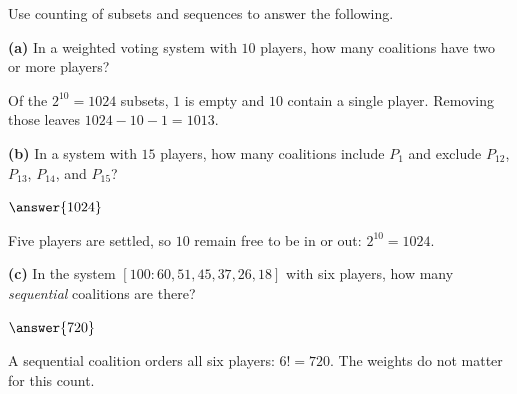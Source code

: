 \documentclass[12pt]{ximera}
\begin{document}
\begin{problem}
Use counting of subsets and sequences to answer the following.

\begin{prompt}
\textbf{(a)} In a weighted voting system with $10$ players, how many coalitions have two
or more players?

\begin{multipleChoice}
\end{multipleChoice}

\begin{feedback}
Of the $2^{10}=1024$ subsets, $1$ is empty and $10$ contain a single player. Removing
those leaves $1024-10-1=1013$.
\end{feedback}
\end{prompt}

\begin{prompt}
\textbf{(b)} In a system with $15$ players, how many coalitions include $P_1$ and exclude
$P_{12}$, $P_{13}$, $P_{14}$, and $P_{15}$?

$\answer{1024}$

\begin{feedback}
Five players are settled, so $10$ remain free to be in or out: $2^{10}=1024$.
\end{feedback}
\end{prompt}

\begin{prompt}
\textbf{(c)} In the system $[100:60,51,45,37,26,18]$ with six players, how many
\emph{sequential} coalitions are there?

$\answer{720}$

\begin{feedback}
A sequential coalition orders all six players: $6!=720$. The weights do not matter for
this count.
\end{feedback}
\end{prompt}
\end{problem}
\end{document}
